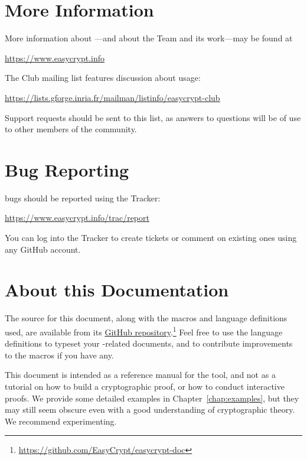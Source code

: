 \section{More Information}

More information about \EasyCrypt---and about the \EasyCrypt Team and
its work---may be found at
\begin{center}
  \url{https://www.easycrypt.info}
\end{center}
The \EasyCrypt Club mailing list features discussion about
\EasyCrypt usage:
\begin{center}
  \url{https://lists.gforge.inria.fr/mailman/listinfo/easycrypt-club}
\end{center}
Support requests should be sent to this list, as answers to questions
will be of use to other members of the \EasyCrypt community.

\section{Bug Reporting}

\EasyCrypt bugs should be reported using the Tracker:
\begin{center}
  \url{https://www.easycrypt.info/trac/report}
\end{center}
You can log into the Tracker to create tickets or comment on existing
ones using any GitHub account.

\section{About this Documentation}

The source for this document, along with the macros and language
definitions used, are available from its
\href{https://github.com/EasyCrypt/easycrypt-doc}{GitHub
  repository}.\footnote{\url{https://github.com/EasyCrypt/easycrypt-doc}}
Feel free to use the language definitions to typeset your
\EasyCrypt-related documents, and to contribute improvements to the
macros if you have any.

This document is intended as a reference manual for the \EasyCrypt
tool, and not as a tutorial on how to build a cryptographic proof, or
how to conduct interactive proofs. We provide some detailed examples
in Chapter~\ref{chap:examples}, but they may still seem obscure even with a
good understanding of cryptographic theory. We recommend
experimenting.
